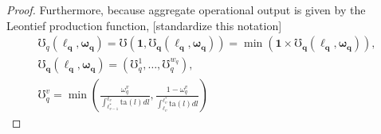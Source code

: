 \documentclass[hidelinks, nonatbib]{elsarticle}
\begin{document}
\begin{lemma}
\begin{proof}
        Furthermore, because aggregate operational output is given by the Leontief production function, [standardize this notation]
        \begin{gather}
            \mho_{q}(
                \boldsymbol{\ell_{q}}
                ,\boldsymbol{\omega_{q}}
            )
            =
            \mho(
                \boldsymbol{1},
                \boldsymbol{\mho_q}(
                    \boldsymbol{\ell_{q}}
                    ,\boldsymbol{\omega_{q}}
                )
            )
            =
            \min(
                \boldsymbol{1}
                \times
                \boldsymbol{\mho_q}(
                    \boldsymbol{\ell_{q}}
                    ,\boldsymbol{\omega_{q}}
                )
            )
            ,
            \\
            \boldsymbol{\mho_q}(
                \boldsymbol{\ell_{q}}
                ,\boldsymbol{\omega_{q}}
            )
            =
            (
                \mho_{q}^{1}
                ,
                \dots
                ,
                \mho_{q}^{w_q}
            )
            ,
            \\
            \mho_{q}^{v} = 
            \min
            \left(
                    \frac{
                        \omega_{q}^{v}
                    }{
                        \int_{\ell_{v-1}^{*}}^{\ell_v}{
                            \text{ta}(l)dl
                        }
                    }
                    ,
                    \frac{
                        1 - \omega_{q}^{v}
                    }{
                        \int_{\ell_v}^{\ell_{v}^{*}}{
                            \text{ta}(l)dl
                        }
                    }
                \right)

\end{gather}
\end{proof}
\end{lemma}
\end{document}
